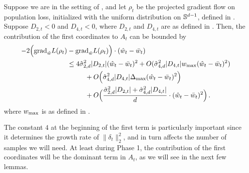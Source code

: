 \begin{lemma}[Contribution of $\w$'s] \label{lemma:A_bound_first_coord}
Suppose we are in the setting of , and let $\rho_t$ be the projected gradient flow on population loss, initialized with the uniform distribution on $\mathbb{S}^{d - 1}$, defined in . Suppose $D_{2,t} < 0$ and $D_{4,t} < 0$, where $D_{2, t}$ and $D_{4, t}$ are as defined in . Then, the contribution of the first coordinates to $A_t$ can be bounded by
\begin{align}
-2 \Big({\textup{grad}}_{\hat{w}} L(\rho_t) & - {\textup{grad}}_{\bar{w}} L(\rho_t) \Big) \cdot (\hat{w}_t - \bar{w}_t) \\
& \leq 4 \hat{\sigma}_{2, d}^2 |D_{2,t}| (\hat{w}_t - \bar{w}_t)^2 + O(\hat{\sigma}_{4, d}^2 |D_{4,t}| {w_{\textup{max}}} (\hat{w}_t - \bar{w}_t)^2) \\
& \,\,\,\,\,\,\,\,\,\,\,\,\,\,\,\, + O\Big(\hat{\sigma}_{4, d}^2 |D_{4,t}| \Delta_{\textup{max}} (\hat{w}_t - \bar{w}_t)^2\Big) \\
& \,\,\,\,\,\,\,\,\,\,\,\,\,\,\,\, + O\Big(\frac{\hat{\sigma}_{2, d}^2 |D_{2, t}| + \hat{\sigma}_{4, d}^2 |D_{4, t}|}{d} \cdot (\hat{w}_t - \bar{w}_t)^2 \Big) \,.
\end{align}
where ${w_{\textup{max}}}$ is as defined in .
\end{lemma}
The constant $4$ at the beginning of the first term is particularly important since it determines the growth rate of $\|\delta_t\|_2^2$, and in turn affects the number of samples we will need. At least during Phase 1, the contribution of the first coordinates will be the dominant term in $A_t$, as we will see in the next few lemmas.
